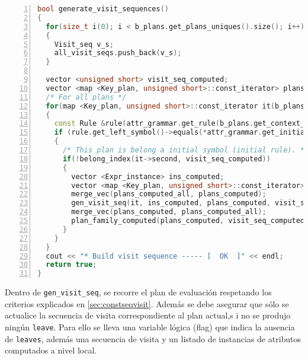 \begin{lstlisting}[language=C++, basicstyle=\tiny, numbers=left, columns=fullflexible, linewidth=14.5cm]
bool generate_visit_sequences()
{
  for(size_t i(0); i < b_plans.get_plans_uniques().size(); i++)
  {
    Visit_seq v_s;
    all_visit_seqs.push_back(v_s);
  }

  vector <unsigned short> visit_seq_computed;
  vector <map <Key_plan, unsigned short>::const_iterator> plans_computed_all;
  /* For all plans */
  for(map <Key_plan, unsigned short>::const_iterator it(b_plans.get_plans().begin()); it != b_plans.get_plans().end(); it++)
  {
    const Rule &rule(attr_grammar.get_rule(b_plans.get_context_unique(it->first.id_plan)[0]));
    if (rule.get_left_symbol()->equals(*attr_grammar.get_initial_symb()))
    {
      /* This plan is belong a initial symbol (initial rule). */
      if(!belong_index(it->second, visit_seq_computed))
      {
        vector <Expr_instance> ins_computed;
        vector <map <Key_plan, unsigned short>::const_iterator> plans_computed;
        merge_vec(plans_computed_all, plans_computed);
        gen_visit_seq(it, ins_computed, plans_computed, visit_seq_computed);
        merge_vec(plans_computed, plans_computed_all);
        plan_family_computed(plans_computed, visit_seq_computed);
      }
    }
  }
  cout << "* Build visit sequence ----- [  OK  ]" << endl;
  return true;
}
\end{lstlisting}

Dentro de \texttt{gen\_visit\_seq}, se recorre el plan de evaluación respetando los criterios explicados en \ref{sec:constseqvisit}. Además se debe asegurar que sólo se actualice la secuencia de visita correspondiente al plan actual,s i no se produjo ningún \texttt{leave}. Para ello se lleva una variable lógica (flag) que indica la ausencia de \texttt{leaves}, además una secuencia de visita y un listado de instancias de atributos computados a nivel local.


